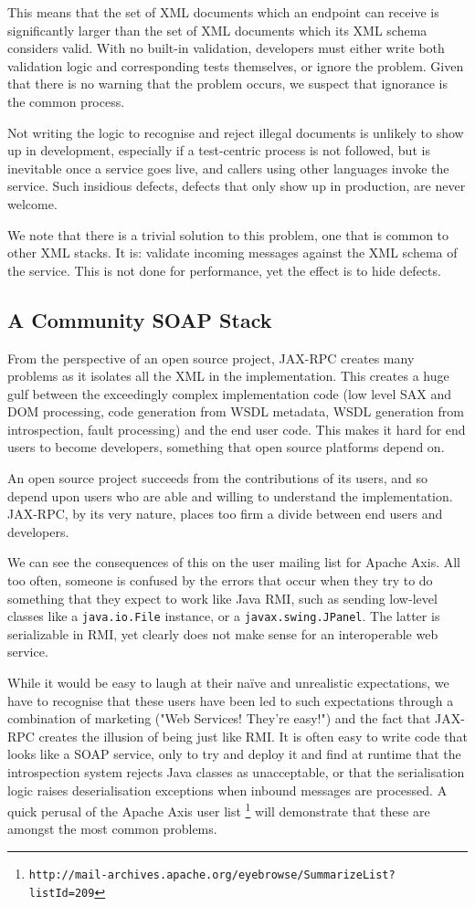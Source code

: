 This means that the set of XML documents which an endpoint can receive
is significantly larger than the set of XML documents which its XML
schema considers valid. With no built-in validation, developers must
either write both validation logic and corresponding tests themselves,
or ignore the problem. Given that there is no warning that the problem
occurs, we suspect that ignorance is the common process. 

Not writing the logic to recognise and reject illegal documents is
unlikely to show up in development, especially if a test-centric
process is not followed, but is inevitable once a service goes live,
and callers using other languages invoke the service. Such insidious
defects, defects that only show up in production, are never welcome.

We note that there is a trivial solution to this problem, one that is
common to other XML stacks. It is: validate incoming messages against
the XML schema of the service. This is not done for performance, yet
the effect is to hide defects.

\subsection{A Community SOAP Stack}
\label{alpine:community}
From the perspective of an open source project, JAX-RPC creates many
problems as it isolates all the XML in the implementation. This
creates a huge gulf between the exceedingly complex implementation
code (low level SAX and DOM processing, code generation from WSDL
metadata, WSDL generation from introspection, fault processing) and
the end user code.  This makes it hard for end users to become
developers, something that open source platforms depend on.  

An open source project succeeds from the contributions of its users,
and so depend upon users who are able and willing to understand the
implementation. JAX-RPC, by its very nature, places too firm a divide
between end users and developers.

We can see the consequences of this on the user mailing list for
Apache Axis. All too often, someone is confused by the errors that
occur when they try to do something that they expect to work like
Java RMI, such as sending low-level classes like a \verb|java.io.File|
instance, or a \verb|javax.swing.JPanel|. The latter is serializable
in RMI, yet clearly does not make sense for an interoperable web
service.

While it would be easy to laugh at their na\"{i}ve and unrealistic
expectations, we have to recognise that these users have been led to
such expectations through a combination of marketing ("Web Services!
They're easy!") and the fact that JAX-RPC creates the illusion of
being just like RMI. It is often easy to write code that looks like a
SOAP service, only to try and deploy it and find at runtime that the
introspection system rejects Java classes as unacceptable, or that the
serialisation logic raises deserialisation exceptions when inbound
messages are processed. A quick perusal of the Apache Axis user list
\footnote{{\small \tt http://mail-archives.apache.org/eyebrowse/SummarizeList?listId=209}}
will demonstrate that these are amongst the most common problems.

